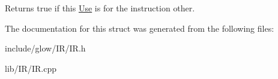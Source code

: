 \begin{DoxyReturn}{Returns}
true if this \hyperlink{structglow_1_1_use}{Use} is for the instruction {\ttfamily other}. 
\end{DoxyReturn}


The documentation for this struct was generated from the following files\+:\begin{DoxyCompactItemize}
\item 
include/glow/\+I\+R/I\+R.\+h\item 
lib/\+I\+R/I\+R.\+cpp\end{DoxyCompactItemize}
